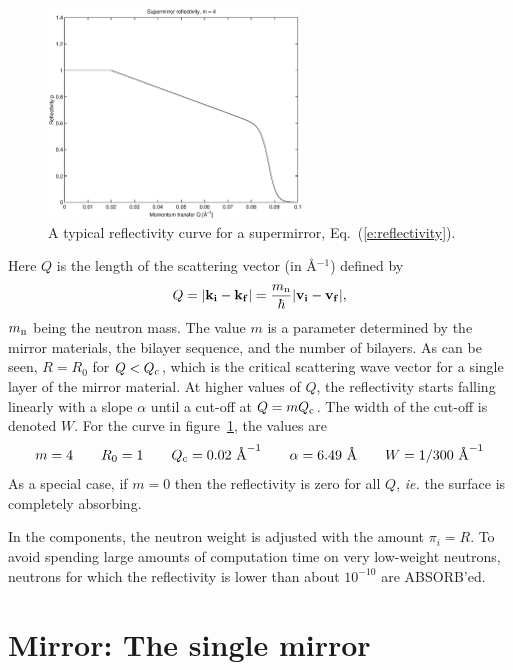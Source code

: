 \begin{figure}
  \begin{center}
    \includegraphics[width=0.6\textwidth]{figures/supermirror.eps}
  \end{center}
\caption{A typical reflectivity curve for a supermirror,
Eq.~(\protect\ref{e:reflectivity}).}
\label{f:reflectivity}
\end{figure}
Here $Q$ is the length of the scattering vector (in \AA$^{-1}$)
defined by
\begin{equation} \label{e:reflectivity}
Q = |{\bf k}_{\bf i} - {\bf k}_{\bf f}|
  = \frac{m_{\rm n}}{\hbar} |{\bf v}_{\bf i} - {\bf v}_{\bf f}|,
\end{equation}
$m_{\rm n}$ being the neutron mass.
The value $m$ is a parameter determined by the mirror materials,
the bilayer sequence, and the number of bilayers.
As can be seen, $R=R_0$ for $Q < Q_{\rm c}$, which is the
critical scattering wave vector for a single layer of the mirror
material. At higher values of $Q$, the reflectivity starts falling
linearly with a slope $\alpha$ until a cut-off at $Q = m Q_{\rm c}$.
The width of the cut-off is denoted $W$. For the curve in
figure~\ref{f:reflectivity}, the values are
$$ m=4 \qquad R_0=1 \qquad Q_{\rm c} = 0.02\mbox{ \AA}^{-1} \qquad
   \alpha = 6.49\mbox{ \AA} \qquad W=1/300\mbox{ \AA}^{-1} $$
As a special case, if $m=0$ then the reflectivity is zero for all $Q$,
   \textit{ie.} the surface is completely absorbing.

In the components, the neutron weight is adjusted with the amount $\pi_i = R$.
To avoid spending large amounts of computation time on very low-weight
neutrons, neutrons for which the reflectivity is lower than about
$10^{-10}$ are ABSORB'ed.

\section{Mirror: The single mirror}

